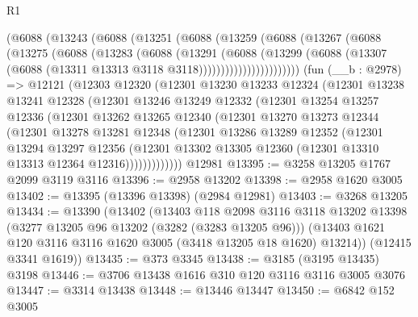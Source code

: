 \begin{lexlean}{R1}
\begin{coremodule}
          (@6088
            (@13243
              (@6088
                (@13251
                  (@6088
                    (@13259
                      (@6088
                        (@13267
                          (@6088
                            (@13275
                              (@6088
                                (@13283
                                  (@6088
                                    (@13291
                                      (@6088
                                        (@13299
                                          (@6088
                                            (@13307
                                              (@6088
                                                (@13311 @13313 @3118 @3118)))))))))))))))))))))))
    (fun (__b : @2978) =>
    @12121
      (@12303
        @12320
        (@12301
          @13230
          @13233
          @12324
          (@12301
            @13238
            @13241
            @12328
            (@12301
              @13246
              @13249
              @12332
              (@12301
                @13254
                @13257
                @12336
                (@12301
                  @13262
                  @13265
                  @12340
                  (@12301
                    @13270
                    @13273
                    @12344
                    (@12301
                      @13278
                      @13281
                      @12348
                      (@12301
                        @13286
                        @13289
                        @12352
                        (@12301
                          @13294
                          @13297
                          @12356
                          (@12301
                            @13302
                            @13305
                            @12360
                            (@12301 @13310 @13313 @12364 @12316)))))))))))))
    @12981
@13395 := @3258 @13205 @1767 @2099 @3119 @3116
@13396 := @2958 @13202
@13398 := @2958 @1620 @3005
@13402 := @13395 (@13396 @13398) (@2984 @12981)
@13403 := @3268 @13205
@13434 := @13390
    (@13402
      (@13403
        @118
        @2098
        @3116
        @3118
        @13202
        @13398
        (@3277 @13205 @96 @13202 (@3282 (@3283 @13205 @96)))
        (@13403 @1621 @120 @3116 @3116 @1620 @3005 (@3418 @13205 @18 @1620) @13214))
      (@12415 @3341 @1619))
@13435 := @373 @3345
@13438 := @3185 (@3195 @13435) @3198
@13446 := @3706 @13438 @1616 @310 @120 @3116 @3116 @3005 @3076
@13447 := @3314 @13438
@13448 := @13446 @13447
@13450 := @6842 @152 @3005

\end{coremodule}
\end{lexlean}
